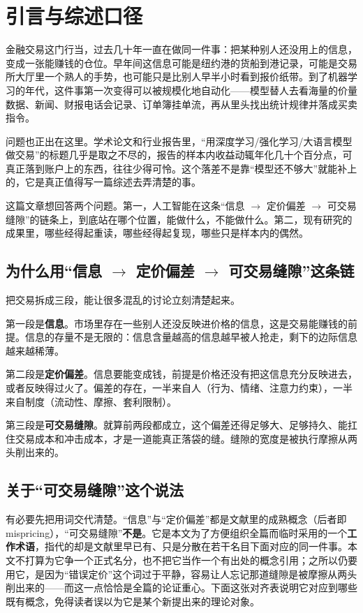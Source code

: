 \section{引言与综述口径}\label{sec:intro}

金融交易这门行当，过去几十年一直在做同一件事：把某种别人还没用上的信息，变成一张能赚钱的仓位。早年间这信息可能是纽约港的货船到港记录，可能是交易所大厅里一个熟人的手势，也可能只是比别人早半小时看到报价纸带。到了机器学习的年代，这件事第一次变得可以被规模化地自动化——模型替人去看海量的价量数据、新闻、财报电话会记录、订单簿挂单流，再从里头找出统计规律并落成买卖指令。

问题也正出在这里。学术论文和行业报告里，“用深度学习/强化学习/大语言模型做交易”的标题几乎是取之不尽的，报告的样本内收益动辄年化几十个百分点，可真正落到账户上的东西，往往少得可怜。这个落差不是靠“模型还不够大”就能补上的，它是真正值得写一篇综述去弄清楚的事。

这篇文章想回答两个问题。第一，人工智能在这条“信息 $\to$ 定价偏差 $\to$ 可交易缝隙”的链条上，到底站在哪个位置，能做什么，不能做什么。第二，现有研究的成果里，哪些经得起重读，哪些经得起复现，哪些只是样本内的偶然。

\subsection{为什么用“信息 $\to$ 定价偏差 $\to$ 可交易缝隙”这条链}

把交易拆成三段，能让很多混乱的讨论立刻清楚起来。

第一段是\textbf{信息}。市场里存在一些别人还没反映进价格的信息，这是交易能赚钱的前提。信息的存量不是无限的：信息含量越高的信息越早被人抢走，剩下的边际信息越来越稀薄。

第二段是\textbf{定价偏差}。信息要能变成钱，前提是价格还没有把这信息充分反映进去，或者反映得过火了。偏差的存在，一半来自人（行为、情绪、注意力约束），一半来自制度（流动性、摩擦、套利限制）。

第三段是\textbf{可交易缝隙}。就算前两段都成立，这个偏差还得足够大、足够持久、能扛住交易成本和冲击成本，才是一道能真正落袋的缝。缝隙的宽度是被执行摩擦从两头削出来的。

\subsection*{关于“可交易缝隙”这个说法}

有必要先把用词交代清楚。“信息”与“定价偏差”都是文献里的成熟概念（后者即 mispricing），“可交易缝隙”\textbf{不是}。它是本文为了方便组织全篇而临时采用的一个\textbf{工作术语}，指代的却是文献里早已有、只是分散在若干名目下面对应的同一件事。本文不打算为它争一个正式名分，也不把它当作一个有出处的概念引用；之所以仍要用它，是因为“错误定价”这个词过于平静，容易让人忘记那道缝隙是被摩擦从两头削出来的——而这一点恰恰是全篇的论证重心。下面这张对齐表说明它对应到哪些既有概念，免得读者误以为它是某个新提出来的理论对象。

